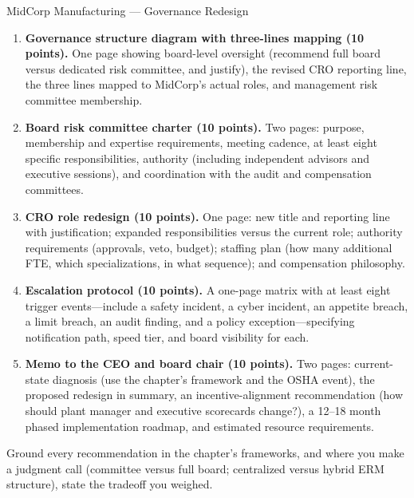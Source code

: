 \documentclass[11pt,openany]{book}
\begin{document}
\begin{minicase}{MidCorp Manufacturing --- Governance Redesign}
\begin{enumerate}
\item \textbf{Governance structure diagram with three-lines mapping
  (10 points).} One page showing board-level oversight (recommend full board
  versus dedicated risk committee, and justify), the revised CRO reporting
  line, the three lines mapped to MidCorp's actual roles, and management
  risk committee membership.
\item \textbf{Board risk committee charter (10 points).} Two pages: purpose,
  membership and expertise requirements, meeting cadence, at least eight
  specific responsibilities, authority (including independent advisors and
  executive sessions), and coordination with the audit and compensation
  committees.
\item \textbf{CRO role redesign (10 points).} One page: new title and
  reporting line with justification; expanded responsibilities versus the
  current role; authority requirements (approvals, veto, budget); staffing
  plan (how many additional FTE, which specializations, in what sequence);
  and compensation philosophy.
\item \textbf{Escalation protocol (10 points).} A one-page matrix with at
  least eight trigger events---include a safety incident, a cyber incident,
  an appetite breach, a limit breach, an audit finding, and a policy
  exception---specifying notification path, speed tier, and board visibility
  for each.
\item \textbf{Memo to the CEO and board chair (10 points).} Two pages:
  current-state diagnosis (use the chapter's framework and the OSHA event),
  the proposed redesign in summary, an incentive-alignment recommendation
  (how should plant manager and executive scorecards change?), a 12--18
  month phased implementation roadmap, and estimated resource requirements.
\end{enumerate}

Ground every recommendation in the chapter's frameworks, and where you make
a judgment call (committee versus full board; centralized versus hybrid ERM
structure), state the tradeoff you weighed.
\end{minicase}

\end{document}
